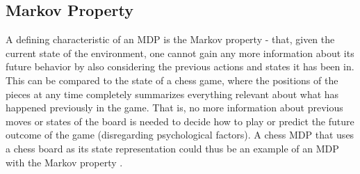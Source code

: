 \subsection{Markov Property}

A defining characteristic of an MDP is the Markov property - that, given the current state of the environment, one cannot gain any more information about its future behavior by also considering the previous actions and states it has been in. This can be compared to the state of a chess game, where the positions of the pieces at any time completely summarizes everything relevant about what has happened previously in the game. That is, no more information about previous moves or states of the board is needed to decide how to play or predict the future outcome of the game (disregarding psychological factors). A chess MDP that uses a chess board as its state representation could thus be an example of an MDP with the Markov property \parencite{altman2002applications}. 